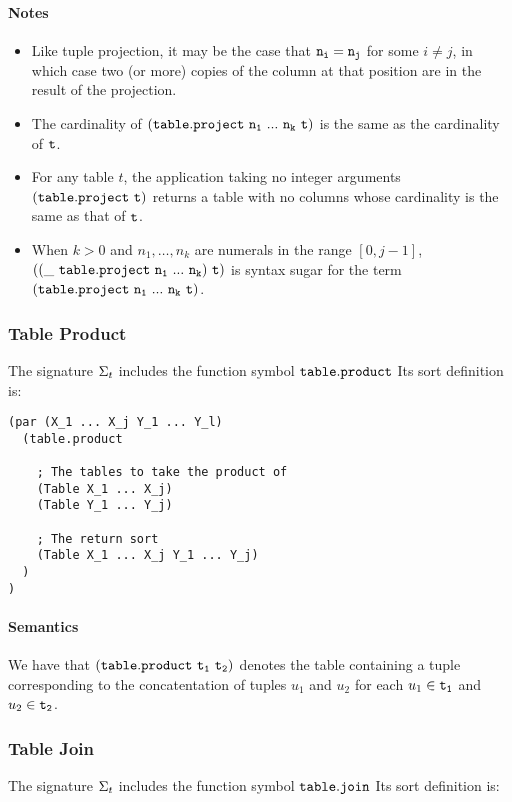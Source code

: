 \documentclass[english,a4paper,10pt]{article}
\begin{document}
\paragraph{Notes}
\begin{itemize}
\item
Like tuple projection,
it may be the case that ${\tt n_i} = {\tt n_j}$ for some $i \neq j$,
in which case two (or more) copies of the column at that position
are in the result of the projection.
\item
The cardinality of $\syntax{(table.project\ n_1\ ...\ n_k\ t)}$ is
the same as the cardinality of ${\tt t}$.
\item
For any table $t$,
the application taking no integer arguments ${\tt (table.project\ t)}$ 
returns a table with no columns whose cardinality is the same as that of ${\tt t}$.
\item
When $k>0$ and
$n_1, \ldots, n_k$ are numerals in the range $[0, j-1]$,
$\syntax{((\_\ table.project\ n_1\ ...\ n_k)\ t)}$ is syntax sugar for the term
$\syntax{(table.project\ n_1\ ...\ n_k\ t)}$.
\end{itemize}

\subsubsection{Table Product}
The signature $\Sigma_{t}$ includes 
the function symbol ${\tt table.product}$
Its sort definition is:

\begin{verbatim}
(par (X_1 ... X_j Y_1 ... Y_l)
  (table.product
  
    ; The tables to take the product of
    (Table X_1 ... X_j)
    (Table Y_1 ... Y_j)

    ; The return sort
    (Table X_1 ... X_j Y_1 ... Y_j)
  )
)
\end{verbatim}
\paragraph{Semantics}
We have that $\syntax{(table.product\ t_1\ t_2)}$
denotes the table containing a tuple corresponding to the concatentation
of tuples $u_1$ and $u_2$
for each $u_1 \in {\tt t_1}$ and $u_2 \in {\tt t_2}$.

\subsubsection{Table Join}
The signature $\Sigma_{t}$ includes 
the function symbol ${\tt table.join}$
Its sort definition is:
\end{document}
